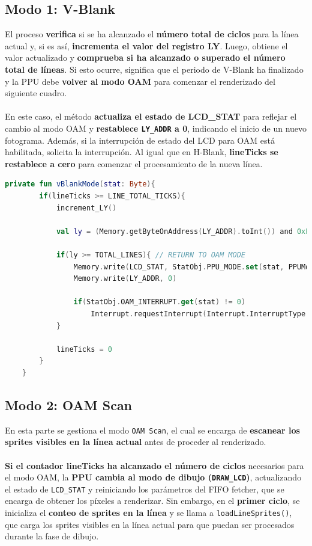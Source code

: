 \subsection{Modo 1: V-Blank}

El proceso \textbf{verifica} si se ha alcanzado el \textbf{número total de ciclos} para la línea actual y, si es así, \textbf{incrementa el valor del registro LY}. Luego, obtiene el valor actualizado y \textbf{comprueba si ha alcanzado o superado el número total de líneas}. Si esto ocurre, significa que el periodo de V-Blank ha finalizado y la PPU debe \textbf{volver al modo OAM} para comenzar el renderizado del siguiente cuadro.
\\\\
En este caso, el método \textbf{actualiza el estado de LCD\_STAT} para reflejar el cambio al modo OAM y \textbf{restablece \texttt{LY\_ADDR} a 0}, indicando el inicio de un nuevo fotograma. Además, si la interrupción de estado del LCD para OAM está habilitada, solicita la interrupción. Al igual que en H-Blank, \textbf{lineTicks se restablece a cero} para comenzar el procesamiento de la nueva línea.

\begin{lstlisting}[language=Kotlin, caption={Lógica del proceso de V-Blank.}, label={code:ppuvblank}]
    private fun vBlankMode(stat: Byte){
        if(lineTicks >= LINE_TOTAL_TICKS){
            increment_LY()

            val ly = (Memory.getByteOnAddress(LY_ADDR).toInt()) and 0xFF

            if(ly >= TOTAL_LINES){ // RETURN TO OAM MODE
                Memory.write(LCD_STAT, StatObj.PPU_MODE.set(stat, PPUMode.OAM.number))
                Memory.write(LY_ADDR, 0)

                if(StatObj.OAM_INTERRUPT.get(stat) != 0)
                    Interrupt.requestInterrupt(Interrupt.InterruptType.LCD_STAT.getByteMask()) // ASK FOR LCD STAT INTERRUPT IF LCD_STAT HAS THE OAM BIT ACTIVATED
            }

            lineTicks = 0
        }
    }
\end{lstlisting}

\subsection{Modo 2: OAM Scan}

En esta parte se gestiona el modo \texttt{OAM Scan}, el cual se encarga de \textbf{escanear los sprites visibles en la línea actual} antes de proceder al renderizado.
\\\\
\textbf{Si el contador lineTicks ha alcanzado el número de ciclos} necesarios para el modo OAM, la \textbf{PPU cambia al modo de dibujo (\texttt{DRAW\_LCD})}, actualizando el estado de \texttt{LCD\_STAT} y reiniciando los parámetros del FIFO fetcher, que se encarga de obtener los píxeles a renderizar. Sin embargo, en el \textbf{primer ciclo}, se inicializa el \textbf{conteo de sprites en la línea} y se llama a \texttt{loadLineSprites()}, que carga los sprites visibles en la línea actual para que puedan ser procesados durante la fase de dibujo.

